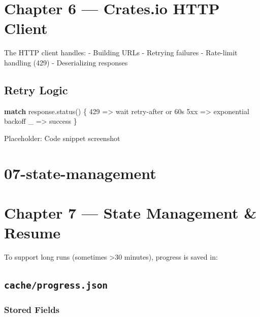 \documentclass[
  letterpaper,
  DIV=11,
  numbers=noendperiod]{scrreprt}
\newenvironment{Shaded}{\begin{snugshade}}{\end{snugshade}}
\newcommand{\ControlFlowTok}[1]{\textcolor[rgb]{0.00,0.23,0.31}{\textbf{#1}}}
\newcommand{\DecValTok}[1]{\textcolor[rgb]{0.68,0.00,0.00}{#1}}
\newcommand{\NormalTok}[1]{\textcolor[rgb]{0.00,0.23,0.31}{#1}}
\newcommand{\OperatorTok}[1]{\textcolor[rgb]{0.37,0.37,0.37}{#1}}
\begin{document}
\chapter{Chapter 6 --- Crates.io HTTP
Client}\label{chapter-6-crates.io-http-client}

The HTTP client handles: - Building URLs - Retrying failures -
Rate-limit handling (429) - Deserializing responses

\section{Retry Logic}\label{retry-logic}

\begin{Shaded}
\begin{Highlighting}[]
\ControlFlowTok{match}\NormalTok{ response}\OperatorTok{.}\NormalTok{status() }\OperatorTok{\{}
    \DecValTok{429} \OperatorTok{=\textgreater{}}\NormalTok{ wait retry}\OperatorTok{{-}}\NormalTok{after or 60s}
\NormalTok{    5xx }\OperatorTok{=\textgreater{}}\NormalTok{ exponential backoff}
\NormalTok{    \_ }\OperatorTok{=\textgreater{}}\NormalTok{ success}
\OperatorTok{\}}
\end{Highlighting}
\end{Shaded}

Placeholder: Code snippet screenshot

\chapter{07-state-management}\label{state-management}

\chapter{Chapter 7 --- State Management \&
Resume}\label{chapter-7-state-management-resume}

To support long runs (sometimes \textgreater30 minutes), progress is
saved in:

\section{\texorpdfstring{\texttt{cache/progress.json}}{cache/progress.json}}\label{cacheprogress.json}

\subsection{Stored Fields}\label{stored-fields}
\end{document}
